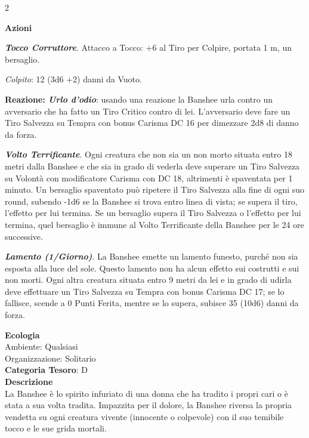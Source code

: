 \begin{multicols}{2}
{\textbf{Azioni}

\emph{\textbf{Tocco Corruttore}}. Attacco a Tocco: +6 al Tiro per Colpire, portata 1 m, un bersaglio.

\emph{Colpito}: 12 (3d6 +2) danni da Vuoto.

\textbf{Reazione: \emph{Urlo d'odio}}: usando una reazione la Banshee urla contro un avversario che ha fatto un Tiro Critico contro di lei. L'avversario deve fare un Tiro Salvezza su Tempra con bonus Carisma DC 16 per dimezzare 2d8 di danno da forza.

\emph{\textbf{Volto Terrificante}}. Ogni creatura che non sia un non morto situata entro 18 metri dalla Banshee e che sia in grado di vederla deve superare un Tiro Salvezza su Volontà con modificatore Carisma con DC 18, altrimenti è spaventata per 1 minuto. Un bersaglio spaventato può ripetere il Tiro Salvezza alla fine di ogni suo round, subendo -1d6 se la Banshee si trova entro linea di vista; se supera il tiro, l'effetto per lui termina. Se un bersaglio supera il Tiro Salvezza o l'effetto per lui termina, quel bersaglio è immune al Volto Terrificante della Banshee per le 24 ore successive.

\emph{\textbf{Lamento (1/Giorno)}}. La Banshee emette un lamento funesto, purché non sia esposta alla luce del sole. Questo lamento non ha alcun effetto sui costrutti e sui non morti. Ogni altra creatura situata entro 9 metri da lei e in grado di udirla deve effettuare un Tiro Salvezza su Tempra con bonus Carisma DC 17; se lo fallisce, scende a 0 Punti Ferita, mentre se lo supera, subisce 35 (10d6) danni da forza.

\textbf{Ecologia}\\
Ambiente: Qualsiasi\\
Organizzazione: Solitario\\
\textbf{Categoria Tesoro}: D\\
\textbf{Descrizione}\\
La Banshee è lo spirito infuriato di una donna che ha tradito i propri cari o è stata a sua volta tradita. Impazzita per il dolore, la Banshee riversa la propria vendetta su ogni creatura vivente (innocente o colpevole) con il suo temibile tocco e le sue grida mortali.

}
\end{multicols}
